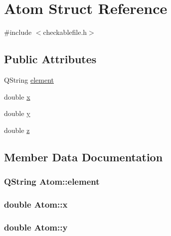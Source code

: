 \hypertarget{struct_atom}{}\section{Atom Struct Reference}
\label{struct_atom}


{\ttfamily \#include $<$checkablefile.\+h$>$}

\subsection*{Public Attributes}
\begin{DoxyCompactItemize}
\item 
Q\+String \hyperlink{struct_atom_ac3240f6db77b22d77f379a28aad5be1a}{element}
\item 
double \hyperlink{struct_atom_a382da4a2a8d20faa2fd1eca986f44056}{x}
\item 
double \hyperlink{struct_atom_aab210323240ea76e6f866113e590cd22}{y}
\item 
double \hyperlink{struct_atom_af1c8b6cd65e2a489b9be339efd7a77ac}{z}
\end{DoxyCompactItemize}


\subsection{Member Data Documentation}
\hypertarget{struct_atom_ac3240f6db77b22d77f379a28aad5be1a}{}
\subsubsection[{element}]{\setlength{\rightskip}{0pt plus 5cm}Q\+String Atom\+::element}\label{struct_atom_ac3240f6db77b22d77f379a28aad5be1a}
\hypertarget{struct_atom_a382da4a2a8d20faa2fd1eca986f44056}{}
\subsubsection[{x}]{\setlength{\rightskip}{0pt plus 5cm}double Atom\+::x}\label{struct_atom_a382da4a2a8d20faa2fd1eca986f44056}
\hypertarget{struct_atom_aab210323240ea76e6f866113e590cd22}{}
\subsubsection[{y}]{\setlength{\rightskip}{0pt plus 5cm}double Atom\+::y}\label{struct_atom_aab210323240ea76e6f866113e590cd22}
\hypertarget{struct_atom_af1c8b6cd65e2a489b9be339efd7a77ac}{}
